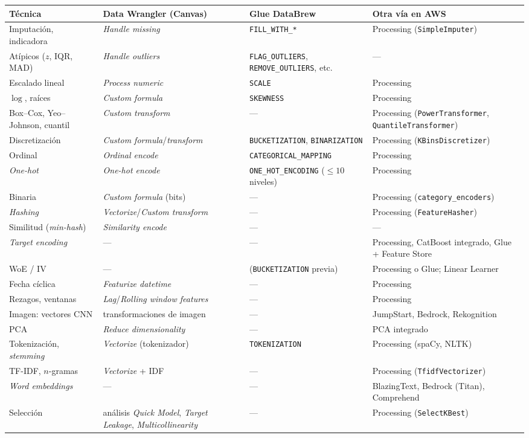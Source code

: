 \documentclass[11pt,a4paper]{article}
\theoremstyle{plain}
\theoremstyle{definition}
\theoremstyle{remark}
\newcommand{\1}{\mathbf{1}}
\begin{document}
\begin{center}
\footnotesize
\begin{tabularx}{\textwidth}{@{}>{\raggedright\arraybackslash}p{2.9cm}YYY@{}}
\toprule
Técnica & Data Wrangler (Canvas) & Glue DataBrew & Otra vía en AWS\\
\midrule
Imputación, indicadora & \emph{Handle missing} & \texttt{FILL\_WITH\_*} & Processing (\texttt{SimpleImputer})\\
Atípicos ($z$, IQR, MAD) & \emph{Handle outliers} & \texttt{FLAG\_OUTLIERS}, \texttt{REMOVE\_OUTLIERS}, etc. & ---\\
Escalado lineal & \emph{Process numeric} & \texttt{SCALE} & Processing\\
$\log$, raíces & \emph{Custom formula} & \texttt{SKEWNESS} & Processing\\
Box--Cox, Yeo--Johnson, cuantil & \emph{Custom transform} & --- & Processing (\texttt{PowerTransformer}, \texttt{QuantileTransformer})\\
Discretización & \emph{Custom formula}/\emph{transform} & \texttt{BUCKETIZATION}, \texttt{BINARIZATION} & Processing (\texttt{KBinsDiscretizer})\\
Ordinal & \emph{Ordinal encode} & \texttt{CATEGORICAL\_MAPPING} & Processing\\
\emph{One-hot} & \emph{One-hot encode} & \texttt{ONE\_HOT\_ENCODING} ($\le10$ niveles) & Processing\\
Binaria & \emph{Custom formula} (bits) & --- & Processing (\texttt{category\_encoders})\\
\emph{Hashing} & \emph{Vectorize}/\emph{Custom transform} & --- & Processing (\texttt{FeatureHasher})\\
Similitud (\emph{min-hash}) & \emph{Similarity encode} & --- & ---\\
\emph{Target encoding} & --- & --- & Processing, CatBoost integrado, Glue + Feature Store\\
WoE / IV & --- & (\texttt{BUCKETIZATION} previa) & Processing o Glue; Linear Learner\\
Fecha cíclica & \emph{Featurize datetime} & --- & Processing\\
Rezagos, ventanas & \emph{Lag}/\emph{Rolling window features} & --- & Processing\\
Imagen: vectores CNN & transformaciones de imagen & --- & JumpStart, Bedrock, Rekognition\\
PCA & \emph{Reduce dimensionality} & --- & PCA integrado\\
Tokenización, \emph{stemming} & \emph{Vectorize} (tokenizador) & \texttt{TOKENIZATION} & Processing (spaCy, NLTK)\\
TF-IDF, $n$-gramas & \emph{Vectorize} + IDF & --- & Processing (\texttt{TfidfVectorizer})\\
\emph{Word embeddings} & --- & --- & BlazingText, Bedrock (Titan), Comprehend\\
Selección & análisis \emph{Quick Model}, \emph{Target Leakage}, \emph{Multicollinearity} & --- & Processing (\texttt{SelectKBest})\\
\bottomrule
\end{tabularx}
\end{center}
\end{document}
